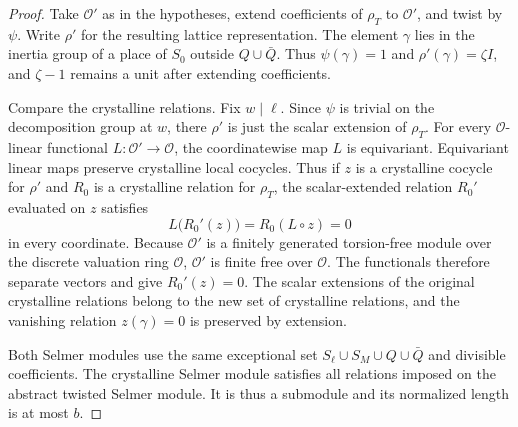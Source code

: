 \begin{proof}
Take $\mathcal O'$ as in the hypotheses, extend coefficients of $\rho_T$ to $\mathcal O'$, and twist by $\psi$. Write $\rho'$ for the resulting lattice representation.
The element $\gamma$ lies in the inertia group of a place of $S_0$ outside $Q\cup\bar Q$. Thus $\psi(\gamma)=1$ and $\rho'(\gamma)=\zeta I$, and $\zeta-1$ remains a unit after extending coefficients.

Compare the crystalline relations. Fix $w\mid\ell$. Since $\psi$ is trivial on the decomposition group at $w$, there $\rho'$ is just the scalar extension of $\rho_T$. For every $\mathcal O$-linear functional $L\colon\mathcal O'\to\mathcal O$, the coordinatewise map $L$ is equivariant. Equivariant linear maps preserve crystalline local cocycles. Thus if $z$ is a crystalline cocycle for $\rho'$ and $R_0$ is a crystalline relation for $\rho_T$, the scalar-extended relation $R_0'$ evaluated on $z$ satisfies
\[
 L\bigl(R_0'(z)\bigr)=R_0(L\circ z)=0
\]
in every coordinate. Because $\mathcal O'$ is a finitely generated torsion-free module over the discrete valuation ring $\mathcal O$, $\mathcal O'$ is finite free over $\mathcal O$. The functionals therefore separate vectors and give $R_0'(z)=0$. The scalar extensions of the original crystalline relations belong to the new set of crystalline relations, and the vanishing relation $z(\gamma)=0$ is preserved by extension.

Both Selmer modules use the same exceptional set $S_\ell\cup S_M\cup Q\cup\bar Q$ and divisible coefficients. The crystalline Selmer module satisfies all relations imposed on the abstract twisted Selmer module. It is thus a submodule and its normalized length is at most $b$.
\end{proof}


